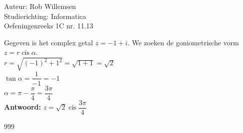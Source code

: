 \documentclass[a4paper]{article}
\begin{document}
\noindent \large Auteur: Rob Willemsen \\
\noindent \large Studierichting: Informatica\\
\noindent \large Oefeningenreeks 1C nr. 11.13\\

\medskip
\normalsize

\noindent Gegeven is het complex getal $z = -1 + i$. We zoeken de goniometrische vorm $z = r \operatorname{cis} \alpha$. \\

$r = \sqrt{(-1)^2 + 1^2} = \sqrt{1 + 1} = \sqrt{2}$ \\

$\tan \alpha = \dfrac{1}{-1} = -1$ \\

$\alpha = \pi - \dfrac{\pi}{4} = \dfrac{3\pi}{4}$ \\

\textbf{Antwoord:} $z = \sqrt{2} \operatorname{cis} \dfrac{3\pi}{4}$ \\

\begin{thebibliography}{999}
\end{thebibliography}
\end{document}

